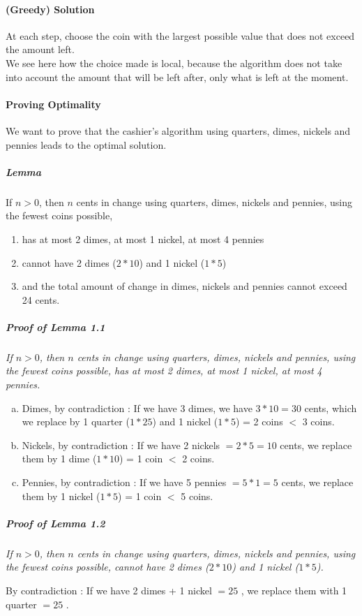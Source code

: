 \documentclass[10pt,a4paper]{book}
\newcommand{\ind}{\hspace*{\parindent}}
\begin{document}
\paragraph*{(Greedy) Solution}
At each step, choose the coin with the largest possible value that does not exceed the amount left. \\
\ind We see here how the choice made is local, because the algorithm does not take into account the amount that will be left after, only what is left at the moment.
\paragraph*{Proving Optimality}
We want to prove that the cashier's algorithm using quarters, dimes, nickels and pennies leads to the optimal solution.
\subparagraph*{Lemma}
If $n > 0$, then $n$ cents in change using quarters, dimes, nickels and pennies, using the fewest coins possible, 
\begin{enumerate}
\item has at most 2 dimes, at most 1 nickel, at most 4 pennies
\item cannot have 2 dimes ($2*10$\textcent) and 1 nickel ($1*5$\textcent)
\item and the total amount of change in dimes, nickels and pennies cannot exceed 24 cents.
\end{enumerate}
\subparagraph*{Proof of Lemma 1.1}
\textit{If $n > 0$, then $n$ cents in change using quarters, dimes, nickels and pennies, using the fewest coins possible, has at most 2 dimes, at most 1 nickel, at most 4 pennies.}
\begin{enumerate}[(a)]
\item Dimes, by contradiction : If we have 3 dimes, we have $3*10 = 30$ cents, which we replace by 1 quarter ($1*25$\textcent) and 1 nickel ($1*5$\textcent) = 2 coins $<$ 3 coins.
\item Nickels, by contradiction : If we have 2 nickels $= 2*5 = 10$ cents, we replace them by 1 dime ($1*10$\textcent) = 1 coin $<$ 2 coins.
\item Pennies, by contradiction : If we have 5 pennies $= 5*1 = 5$ cents, we replace them by 1 nickel ($1*5$\textcent) = 1 coin $<$ 5 coins. 
\end{enumerate}
\subparagraph*{Proof of Lemma 1.2}
\textit{If $n > 0$, then $n$ cents in change using quarters, dimes, nickels and pennies, using the fewest coins possible, cannot have 2 dimes ($2*10$\textcent) and 1 nickel ($1*5$\textcent).}\par
By contradiction : If we have 2 dimes + 1 nickel $= 25$ \textcent, we replace them with 1 quarter $= 25$ \textcent.
\end{document}

